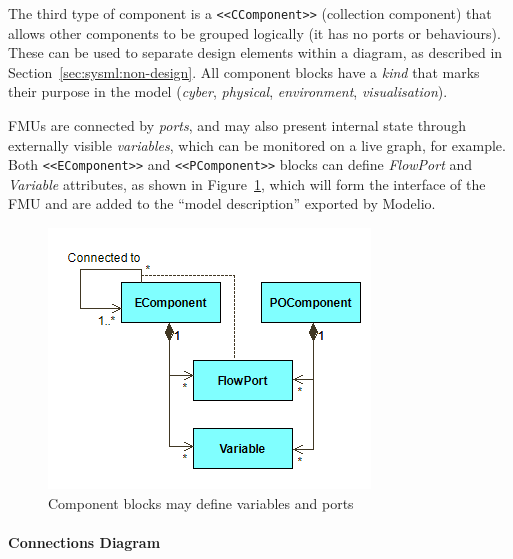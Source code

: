 The third type of component is a \texttt{<<CComponent>>} (collection component) that allows other components to be grouped logically (it has no ports or behaviours). These can be used to separate design elements within a diagram, as described in Section~\ref{sec:sysml:non-design}. All component blocks have a \emph{kind} that marks their purpose in the model (\emph{cyber}, \emph{physical}, \emph{environment}, \emph{visualisation}).

FMUs are connected by \emph{ports}, and may also present internal state through externally visible \emph{variables}, which can be monitored on a live graph, for example. Both \texttt{<<EComponent>>} and \texttt{<<PComponent>>} blocks can define \emph{FlowPort} and \emph{Variable} attributes, as shown in Figure~\ref{fig:sysml:sysml:intocps:asi}, which will form the interface of the FMU and are added to the ``model description'' exported by Modelio.

\begin{figure}[h!]
\centering
\includegraphics[scale=0.6]{figures/Architecting/ArchitecturalStructureInterfaces}
\caption{Component blocks may define variables and ports}
\label{fig:sysml:sysml:intocps:asi}
\end{figure}


\paragraph{Connections Diagram}
\label{sec:sysml:intocps:cd}

